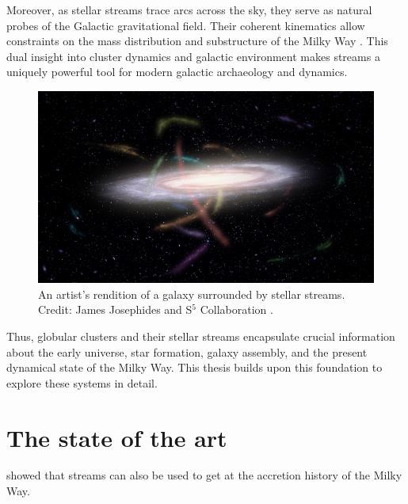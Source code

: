     Moreover, as stellar streams trace arcs across the sky, they serve as natural probes of the Galactic gravitational field. Their coherent kinematics allow constraints on the mass distribution and substructure of the Milky Way \citep{2011MNRAS.417..198V,2023ApJ...954..195N}. This dual insight into cluster dynamics and galactic environment makes streams a uniquely powerful tool for modern galactic archaeology and dynamics.

    \begin{figure}
        \centering
        \includegraphics[width=\linewidth]{images/S5MilkywayStreams.jpg}
        \caption{An artist's rendition of a galaxy surrounded by stellar streams. Credit: James Josephides and S$^5$ Collaboration \citep{2019MNRAS.490.3508L}.}
        \label{fig:S5MilkywayStreams}
    \end{figure}

    Thus, globular clusters and their stellar streams encapsulate crucial information about the early universe, star formation, galaxy assembly, and the present dynamical state of the Milky Way. This thesis builds upon this foundation to explore these systems in detail.



\section{The state of the art}

\citet{2021ApJ...909L..26B} showed that streams can also be used to get at the accretion history of the Milky Way. 



